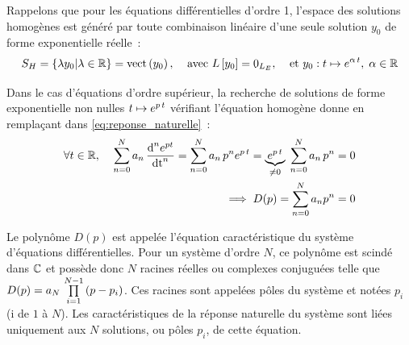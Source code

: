 \begin{remark}{}
        


      Rappelons que pour les équations différentielles d'ordre 1,
      l'espace des solutions homogènes est généré par toute
      combinaison linéaire d'une seule solution
      $y_0$ de forme exponentielle réelle~:
      \begin{equation}
        \label{eq:sol_homogene_ordre_1}
        S_H=\left\{\lambda y_0|\lambda\in\mathbb{R}\right\}=\mathrm{vect}\left(y_0\right),\;\;\;\; \text{avec } L\left[y_0\right]=\mathrm{0}_{L_E},\;\;\;\; \text{et } y_0: t\mapsto e^{\alpha\,t},\;\alpha \in \mathbb{R} 
      \end{equation}

      Dans le cas d'équations d'ordre supérieur, la recherche de
      solutions de forme exponentielle non nulles
      $t\mapsto e^{p\,t}$ vérifiant l'équation homogène donne en
      remplaçant dans \eqref{eq:reponse_naturelle}~:
      \begin{eqnarray} \label{solution_reponse_naturelle} \forall
        t\in\mathbb{R},\;\;\;\; \sum\limits_{n=0}^N a_{n}\,\frac{\mathrm{d{}}^{n}e^{p
            t}}{{\mathrm{d{t}}}^{n}} =
        \sum\limits_{n=0}^N a_{n}\,p^{n} e^{p\,t} =\underbrace{e^{p\,t}}_{\neq 0}\;\sum\limits_{n=0}^N a_{n}\,p^{n}  =0\\
        \implies D(p)= \sum_{n=0}^N a_{n} p^{n} = 0
      \end{eqnarray}

      Le polynôme $D(p)$ est appelée l'équation caractéristique du
      système d'équations différentielles. Pour un système d'ordre
      $N$, ce polynôme est scindé dans $\mathbb{C}$ et possède donc $N$
      racines réelles ou complexes conjuguées telle que
      $D(p)=a_N\,\prod\limits_{i=1}^{N-1}\left(p-p_i\right)$. Ces racines sont appelées
      pôles du système et notées $p_i$ (i de $1$ à $N$). Les
      caractéristiques de la réponse naturelle du système sont liées
      uniquement aux $N$ solutions, ou pôles $p_{i}$, de cette
      équation.


\end{remark}
